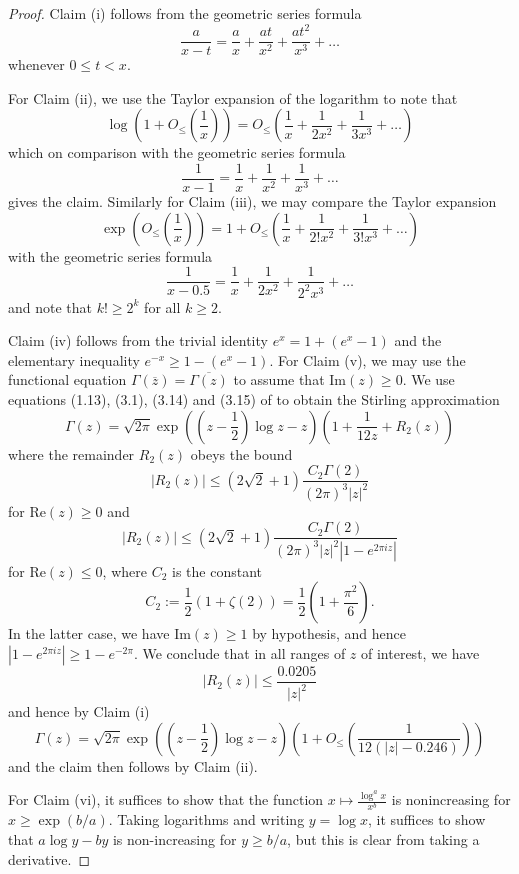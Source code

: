 \begin{proof}  Claim (i) follows from the geometric series formula
$$ \frac{a}{x-t} = \frac{a}{x} + \frac{at}{x^2} + \frac{at^2}{x^3} + \dots$$
whenever $0 \leq t < x$.

For Claim (ii), we use the Taylor expansion of the logarithm to note that
$$\log( 1 + O_{\leq}(\frac{1}{x}) ) = O_{\leq}(\frac{1}{x} + \frac{1}{2x^2} + \frac{1}{3x^3} + \dots)$$
which on comparison with the geometric series formula
$$\frac{1}{x-1} = \frac{1}{x} + \frac{1}{x^2} + \frac{1}{x^3} + \dots$$
gives the claim.  Similarly for Claim (iii), we may compare the Taylor expansion
$$\exp( O_{\leq}(\frac{1}{x}) ) = 1 + O_{\leq}(\frac{1}{x} + \frac{1}{2! x^2} + \frac{1}{3! x^3} + \dots)$$
with the geometric series formula
$$ \frac{1}{x-0.5} = \frac{1}{x} + \frac{1}{2x^2} + \frac{1}{2^2 x^3} + \dots$$
and note that $k! \geq 2^k$ for all $k \geq 2$.

Claim (iv) follows from the trivial identity $e^x = 1 + (e^x-1)$ and the elementary inequality $e^{-x} \geq 1 - (e^x-1)$.
For Claim (v), we may use the functional equation $\Gamma(\overline{z}) = \overline{\Gamma(z)}$ to assume that $\mathrm{Im}(z) \geq 0$.  We use equations (1.13), (3.1), (3.14) and (3.15) of \cite{boyd} to obtain the Stirling approximation
$$ \Gamma(z) = \sqrt{2\pi} \exp( (z-\frac{1}{2}) \log z - z ) (1 + \frac{1}{12 z} + R_2(z) )$$
where the remainder $R_2(z)$ obeys the bound
$$ |R_2(z)| \leq (2 \sqrt{2}+1) \frac{C_2 \Gamma(2)}{(2\pi)^3 |z|^2} $$
for $\mathrm{Re}(z) \geq 0$ and
$$|R_2(z)| \leq (2 \sqrt{2}+1) \frac{C_2 \Gamma(2)}{(2\pi)^3 |z|^2 |1 - e^{2\pi i z}|} $$
for $\mathrm{Re}(z) \leq 0$, where $C_2$ is the constant
$$ C_2 := \frac{1}{2} (1 + \zeta(2)) = \frac{1}{2} (1 + \frac{\pi^2}{6}).$$
In the latter case, we have $\mathrm{Im}(z) \geq 1$ by hypothesis, and hence $|1 - e^{2\pi i z}| \geq 1 - e^{-2\pi}$.  We conclude that in all ranges of $z$ of interest, we have
$$|R_2(z)| \leq \frac{0.0205}{|z|^2}$$
and hence by Claim (i)
$$ \Gamma(z) = \sqrt{2\pi} \exp( (z-\frac{1}{2}) \log z - z ) (1 + O_{\leq}( \frac{1}{12(|z| - 0.246)} )) $$
and the claim then follows by Claim (ii).  

For Claim (vi), it suffices to show that the function $x \mapsto \frac{\log^a x}{x^b}$ is nonincreasing for $x \geq \exp(b/a)$.  Taking logarithms and writing $y = \log x$, it suffices to show that $a \log y - by$ is non-increasing for $y \geq b/a$, but this is clear from taking a derivative.
\end{proof}
